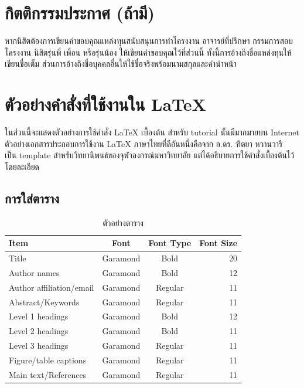 \documentclass[11pt,a4paper]{article}
\begin{document}
\section{กิตติกรรมประกาศ (ถ้ามี)}
หากนิสิตต้องการเขียนคำขอบคุณแหล่งทุนสนับสนุนการทำโครงงาน อาจารย์ที่ปรึกษา กรรมการสอบโครงงาน นิสิตรุ่นพี่ เพื่อน หรือรุ่นน้อง ให้เขียนคำขอบคุณไว้ที่ส่วนนี้ ทั้งนี้การอ้างถึงชื่อแหล่งทุนให้เขียนชื่อเต็ม ส่วนการอ้างถึงชื่อบุคคลอื่นให้ใช้ชื่อจริงพร้อมนามสกุลและคำนำหน้า

\section{ตัวอย่างคำสั่งที่ใช้งานใน LaTeX}
ในส่วนนี้จะแสดงตัวอย่างการใช้คำสั่ง LaTeX เบื้องต้น สำหรับ tutorial นั้นมีมากมายบน Internet ตัวอย่างเอกสารประกอบการใช้งาน LaTeX ภาษาไทยที่ดีอันหนึ่งคือจาก อ.ดร. ฑิตยา หวานวารี~\cite{cuthesis} เป็น template สำหรับวิทยานิพนธ์ของจุฬาลงกรณ์มหาวิทยาลัย แต่ได้อธิบายการใช้คำสั่งเบื้องต้นไว้โดยละเอียด

\subsection{การใส่ตาราง}
\begin{table}[ht]
\centering
\caption{ตัวอย่างตาราง} 
\vspace{3mm}
\begin{tabular}{|l|c|c|r|} \hline
Item & Font & Font Type & Font Size \\ \hline
Title & Garamond & Bold & 20 \\
Author names & Garamond & Bold & 12 \\ 
Author affiliation/email & Garamond & Regular & 11 \\
Abstract/Keywords & Garamond & Regular & 11 \\
Level 1 headings & Garamond & Bold & 12 \\
Level 2 headings & Garamond & Bold & 11 \\
Level 3 headings & Garamond & Regular & 11 \\
Figure/table captions & Garamond & Regular & 11 \\
Main text/References & Garamond & Regular & 11 \\ \hline
\end{tabular}
\end{table}
\end{document}
